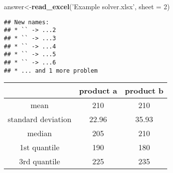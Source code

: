 \documentclass[
]{article}
\newenvironment{Shaded}{\begin{snugshade}}{\end{snugshade}}
\newcommand{\DataTypeTok}[1]{\textcolor[rgb]{0.13,0.29,0.53}{#1}}
\newcommand{\DecValTok}[1]{\textcolor[rgb]{0.00,0.00,0.81}{#1}}
\newcommand{\KeywordTok}[1]{\textcolor[rgb]{0.13,0.29,0.53}{\textbf{#1}}}
\newcommand{\NormalTok}[1]{#1}
\newcommand{\StringTok}[1]{\textcolor[rgb]{0.31,0.60,0.02}{#1}}
\begin{document}
\begin{Shaded}
\begin{Highlighting}[]
\NormalTok{answer<-}\KeywordTok{read_excel}\NormalTok{(}\StringTok{'Example solver.xlsx'}\NormalTok{, }\DataTypeTok{sheet =} \DecValTok{2}\NormalTok{)}
\end{Highlighting}
\end{Shaded}

\begin{verbatim}
## New names:
## * `` -> ...2
## * `` -> ...3
## * `` -> ...4
## * `` -> ...5
## * `` -> ...6
## * ... and 1 more problem
\end{verbatim}

\begin{table}[H]
\centering
{}
\end{table}

\begin{tabular}{ccc}
\toprule
 & product a & product b\\
\midrule
mean & 210 & 210\\
standard deviation & 22.96 & 35.93\\
median & 205 & 210\\
1st quantile & 190 & 180\\
3rd quantile & 225 & 235\\
\bottomrule
\end{tabular}

\begingroup\fontsize{7}{9}\selectfont
\end{document}
